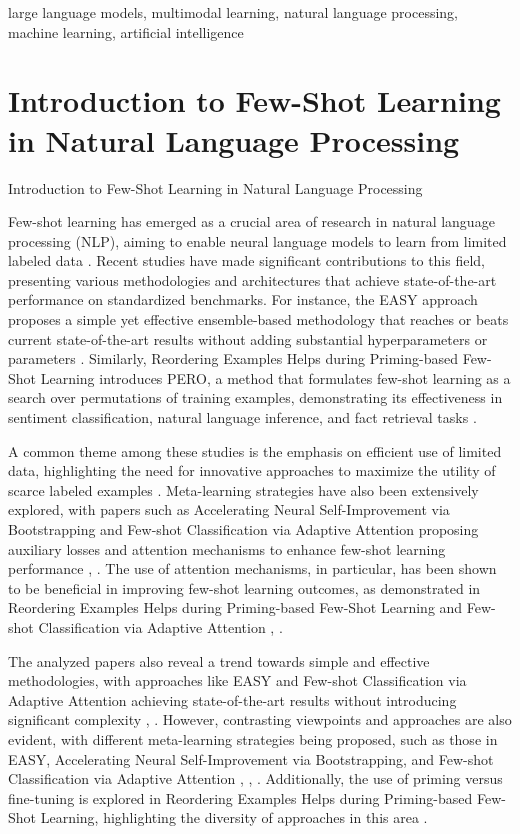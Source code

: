 \documentclass[conference]{IEEEtran}
\begin{document}
\begin{IEEEkeywords}
large language models, multimodal learning, natural language processing, machine learning, artificial intelligence
\end{IEEEkeywords}


\section{Introduction to Few-Shot Learning in Natural Language Processing}
Introduction to Few-Shot Learning in Natural Language Processing

Few-shot learning has emerged as a crucial area of research in natural language processing (NLP), aiming to enable neural language models to learn from limited labeled data \cite{b1}. Recent studies have made significant contributions to this field, presenting various methodologies and architectures that achieve state-of-the-art performance on standardized benchmarks. For instance, the EASY approach proposes a simple yet effective ensemble-based methodology that reaches or beats current state-of-the-art results without adding substantial hyperparameters or parameters \cite{b2}. Similarly, Reordering Examples Helps during Priming-based Few-Shot Learning introduces PERO, a method that formulates few-shot learning as a search over permutations of training examples, demonstrating its effectiveness in sentiment classification, natural language inference, and fact retrieval tasks \cite{b3}.

A common theme among these studies is the emphasis on efficient use of limited data, highlighting the need for innovative approaches to maximize the utility of scarce labeled examples \cite{b4}. Meta-learning strategies have also been extensively explored, with papers such as Accelerating Neural Self-Improvement via Bootstrapping and Few-shot Classification via Adaptive Attention proposing auxiliary losses and attention mechanisms to enhance few-shot learning performance \cite{b5}, \cite{b6}. The use of attention mechanisms, in particular, has been shown to be beneficial in improving few-shot learning outcomes, as demonstrated in Reordering Examples Helps during Priming-based Few-Shot Learning and Few-shot Classification via Adaptive Attention \cite{b3}, \cite{b6}.

The analyzed papers also reveal a trend towards simple and effective methodologies, with approaches like EASY and Few-shot Classification via Adaptive Attention achieving state-of-the-art results without introducing significant complexity \cite{b2}, \cite{b6}. However, contrasting viewpoints and approaches are also evident, with different meta-learning strategies being proposed, such as those in EASY, Accelerating Neural Self-Improvement via Bootstrapping, and Few-shot Classification via Adaptive Attention \cite{b2}, \cite{b5}, \cite{b6}. Additionally, the use of priming versus fine-tuning is explored in Reordering Examples Helps during Priming-based Few-Shot Learning, highlighting the diversity of approaches in this area \cite{b3}.
\end{document}
